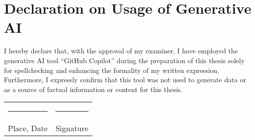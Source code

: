 \chapter*{Declaration on Usage of Generative AI}

I hereby declare that, with the approval of my examiner, I have
employed the generative AI tool \enquote{GitHub Copilot} during the
preparation of this thesis solely for spellchecking and enhancing the
formality of my written expression. Furthermore, I expressly confirm
that this tool was not used to generate data or as a source of
factual information or content for this thesis.\\[3\normalbaselineskip]
\begin{tabular}{p{} l}
      \rule{\textwidth/3}{0.4pt} & \rule{\textwidth/3}{0.4pt} \\
      Place, Date                & Signature
\end{tabular}